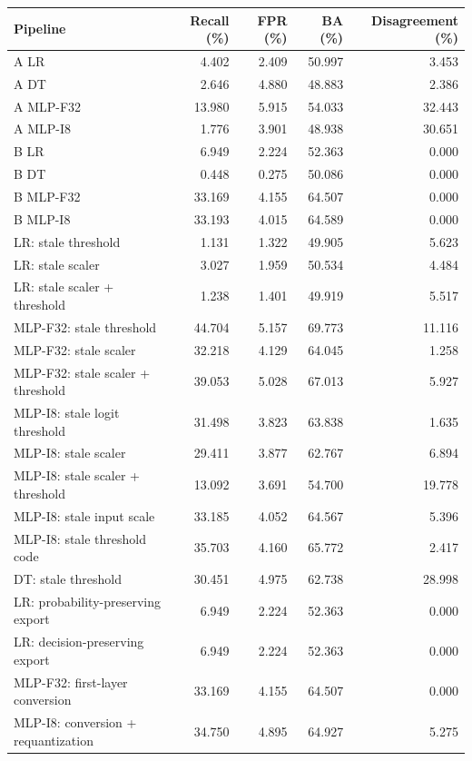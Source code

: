 \begin{tabular}{lrrrr}
\toprule
Pipeline & Recall (\%) & FPR (\%) & BA (\%) & Disagreement (\%) \\
\midrule
A LR & 4.402 & 2.409 & 50.997 & 3.453 \\
A DT & 2.646 & 4.880 & 48.883 & 2.386 \\
A MLP-F32 & 13.980 & 5.915 & 54.033 & 32.443 \\
A MLP-I8 & 1.776 & 3.901 & 48.938 & 30.651 \\
\midrule
B LR & 6.949 & 2.224 & 52.363 & 0.000 \\
B DT & 0.448 & 0.275 & 50.086 & 0.000 \\
B MLP-F32 & 33.169 & 4.155 & 64.507 & 0.000 \\
B MLP-I8 & 33.193 & 4.015 & 64.589 & 0.000 \\
\midrule
LR: stale threshold & 1.131 & 1.322 & 49.905 & 5.623 \\
LR: stale scaler & 3.027 & 1.959 & 50.534 & 4.484 \\
LR: stale scaler + threshold & 1.238 & 1.401 & 49.919 & 5.517 \\
MLP-F32: stale threshold & 44.704 & 5.157 & 69.773 & 11.116 \\
MLP-F32: stale scaler & 32.218 & 4.129 & 64.045 & 1.258 \\
MLP-F32: stale scaler + threshold & 39.053 & 5.028 & 67.013 & 5.927 \\
MLP-I8: stale logit threshold & 31.498 & 3.823 & 63.838 & 1.635 \\
MLP-I8: stale scaler & 29.411 & 3.877 & 62.767 & 6.894 \\
MLP-I8: stale scaler + threshold & 13.092 & 3.691 & 54.700 & 19.778 \\
MLP-I8: stale input scale & 33.185 & 4.052 & 64.567 & 5.396 \\
MLP-I8: stale threshold code & 35.703 & 4.160 & 65.772 & 2.417 \\
DT: stale threshold & 30.451 & 4.975 & 62.738 & 28.998 \\
\midrule
LR: probability-preserving export & 6.949 & 2.224 & 52.363 & 0.000 \\
LR: decision-preserving export & 6.949 & 2.224 & 52.363 & 0.000 \\
MLP-F32: first-layer conversion & 33.169 & 4.155 & 64.507 & 0.000 \\
MLP-I8: conversion + requantization & 34.750 & 4.895 & 64.927 & 5.275 \\
\bottomrule
\end{tabular}

